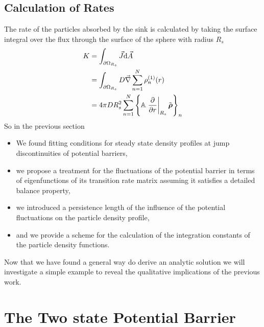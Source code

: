 \subsection{Calculation of Rates}
\label{Rates}
The rate of the particles absorbed by the sink is calculated by taking the surface integral over the flux through the surface of the sphere with radius $R_s$
\begin{align}
    K   &= \int_{\partial \Omega_{R_s}} \vec{J} {\rm d} \vec{A}\nonumber\\
    &= \int_{\partial \Omega_{R_s}} D \vec{\nabla} \sum_{n=1}^{N} \rho_n^{(1)}(r)\nonumber \\
    &= 4 \pi D R_s^{2} \sum_{n=1}^{N} \left\{ \mathbb{A} \left. \frac{\partial}{ \partial r}\right|_{R_s} \tilde{\boldsymbol{\mathbf{\rho}}} \right\}_n
    \label{Rate}
\end{align}
        So in the previous section 
\begin{itemize}
    \item We found fitting conditions for steady state density profiles at jump discontinuities of potential barriers,
    \item we propose a treatment for the fluctuations of the potential barrier in terms of eigenfunctions of its transition rate matrix assuming it satisfies a detailed balance property,
    \item we introduced a persistence length of the influence of the potential fluctuations on the particle density profile,
    \item and we provide a scheme for the calculation of the integration constants of the particle density functions.
\end{itemize}
Now that we have found a general way do derive an analytic solution we will investigate a simple example to reveal the qualitative implications of the previous work. 
\newpage
\section{The Two state Potential Barrier}

